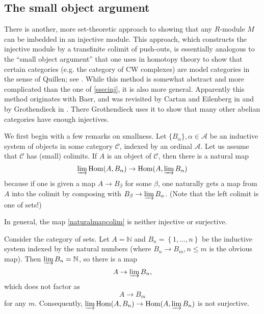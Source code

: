 \subsection{The small object argument}

There is another, more set-theoretic approach to showing that any $R$-module
$M$ can be imbedded in an injective module.
This approach, which constructs the injective module by  a transfinite
colimit of push-outs, is essentially analogous to the ``small object
argument'' that one uses in homotopy theory to show that certain categories
(e.g. the category of CW complexes) are model categories in the sense of
Quillen; see \cite{Ho07}.
While this method is somewhat abstract and more complicated than the one of 
\cref{ssecinj}, it is also more general. Apparently this method originates with Baer,
and was revisited by Cartan and Eilenberg in
\cite{Cartan-Eilenberg} and by Grothendieck in \cite{Gr57}.
There Grothendieck uses it to show that
many other abelian categories have enough injectives.

We first begin with a few remarks on smallness.
Let $\{B_{\alpha}\}, \alpha \in \mathcal{A}$ be an inductive system of objects in some
category $\mathcal{C}$, indexed by
an ordinal $\mathcal{A}$. Let us assume that $\mathcal{C}$ has (small)
colimits. If $A$ is an object of $\mathcal{C}$, then there is a
natural map
\begin{equation} \label{naturalmapcolim} \varinjlim \hom(A, B_\alpha) \to
\hom(A, \varinjlim B_\alpha)  \end{equation}
because if one is given a map $A \to B_\beta$ for some $\beta$, one
naturally gets a map from $A$  into the colimit by composing with $B_\beta
\to \varinjlim B_\alpha$. (Note that the left colimit is one of sets!)


In general, the map \cref{naturalmapcolim} is neither injective or surjective.

\begin{example} 
Consider the category of sets. Let $A = \mathbb{N}$ and $B_n = \left\{1,
\dots, n\right\}$ be the inductive system indexed by the natural numbers
(where $B_n \to B_{m}, n \leq m$ is the obvious map). Then $\varinjlim B_n =
\mathbb{N}$, so there is a map
\[ A \to \varinjlim B_n,  \]
which does not factor as 
\[ A \to B_m  \]
for any $m$. Consequently, $\varinjlim \hom(A, B_n) \to \hom(A, \varinjlim
B_n)$ is not surjective.
\end{example} 

